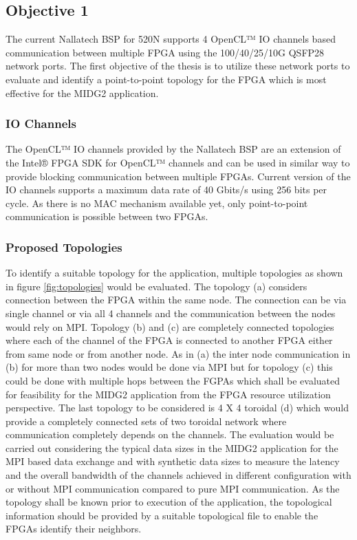 \documentclass[english,notitlepage]{hgbreport}
\begin{document}
\subsection{Objective 1}

The current Nallatech BSP for 520N supports 4 OpenCL™ IO channels based communication between
multiple FPGA using the 100/40/25/10G QSFP28 network ports. The first objective of
the thesis is to utilize these network ports to evaluate and identify a point-to-point
topology for the FPGA which is most effective for the MIDG2 application.

\subsubsection{IO Channels}

The OpenCL™ IO channels provided by the Nallatech BSP are an extension of the Intel® FPGA SDK for OpenCL™ channels \cite{noauthor_intel_2018}
and can be used in similar way to provide blocking communication between multiple FPGAs.
Current version of the IO channels supports a maximum data rate of 40 Gbits/s using 256 bits per cycle.
As there is no MAC mechanism available yet, only point-to-point communication is possible between
two FPGAs.

\subsubsection{Proposed Topologies}
\label{sub:topologies}

To identify a suitable topology for the application, multiple topologies
as shown in figure \ref{fig:topologies} would be evaluated. The topology (a)
considers connection between the FPGA within the same node. The connection can be via single channel
or via all 4 channels and the communication between the nodes would rely on MPI. Topology (b) and (c)
are completely connected topologies where each of the channel of the FPGA is connected to another FPGA
either from same node or from another node. As in (a) the inter node communication in (b) for more than two nodes
would be done via MPI but for topology (c) this could be done with multiple hops between the FGPAs which shall be evaluated
for feasibility for the MIDG2 application from the FPGA resource utilization perspective. The last topology
to be considered is 4 X 4 toroidal (d) which would provide a completely connected sets of two toroidal network where
communication completely depends on the channels. The evaluation would be carried out considering the typical 
data sizes in the MIDG2 application for the MPI based data exchange and with synthetic data sizes
to measure the latency and the overall bandwidth of the channels achieved in different configuration 
with or without MPI communication compared to pure MPI communication.
As the topology shall be known prior to execution of the application, the topological information should
be provided by a suitable topological file to enable the FPGAs identify their neighbors.
\end{document}
